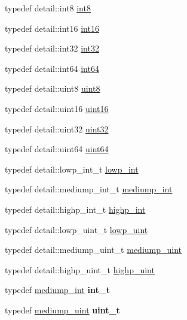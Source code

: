 \begin{DoxyCompactItemize}
\item 
typedef detail\+::int8 \hyperlink{group__gtc__type__precision_ga96254f9c1c4506fc8eb5cf3301ce8565}{int8}
\item 
typedef detail\+::int16 \hyperlink{group__gtc__type__precision_ga2945a61d12771f8954994fcddf02b021}{int16}
\item 
typedef detail\+::int32 \hyperlink{group__gtc__type__precision_ga632d8b25f6b61659f39ea4321fab92a4}{int32}
\item 
typedef detail\+::int64 \hyperlink{group__gtc__type__precision_ga435d75819cce297cc5fa21bd84ef89a5}{int64}
\item 
typedef detail\+::uint8 \hyperlink{group__gtc__type__precision_ga1a7dcd8aac97cc8020817c94049deff2}{uint8}
\item 
typedef detail\+::uint16 \hyperlink{group__gtc__type__precision_gad8c2939e1fdd8e5828b31d95c52255d5}{uint16}
\item 
typedef detail\+::uint32 \hyperlink{group__gtc__type__precision_ga202b6a53c105fcb7e531f9b443518451}{uint32}
\item 
typedef detail\+::uint64 \hyperlink{group__gtc__type__precision_gae3632bf9b37da66233d78930dd06378a}{uint64}
\item 
typedef detail\+::lowp\+\_\+int\+\_\+t \hyperlink{group__core__precision_ga4681244bf4a184734f03aa9df4e3d288}{lowp\+\_\+int}
\item 
typedef detail\+::mediump\+\_\+int\+\_\+t \hyperlink{group__core__precision_ga2a3dcbcd7f4e17663d393a12061ac6ac}{mediump\+\_\+int}
\item 
typedef detail\+::highp\+\_\+int\+\_\+t \hyperlink{group__core__precision_gaafed5240eb0a43328cb75faf5fb0a8c2}{highp\+\_\+int}
\item 
typedef detail\+::lowp\+\_\+uint\+\_\+t \hyperlink{group__core__precision_ga8077c90f2c87e419ea6c273157dcc1fc}{lowp\+\_\+uint}
\item 
typedef detail\+::mediump\+\_\+uint\+\_\+t \hyperlink{group__core__precision_ga08ae38ad78ade3539fdd1d25052b8c51}{mediump\+\_\+uint}
\item 
typedef detail\+::highp\+\_\+uint\+\_\+t \hyperlink{group__core__precision_gabfd1cf11193324a5f77d3831b6ac3205}{highp\+\_\+uint}
\item 
typedef \hyperlink{group__core__precision_ga2a3dcbcd7f4e17663d393a12061ac6ac}{mediump\+\_\+int} {\bfseries int\+\_\+t}
\item 
typedef \hyperlink{group__core__precision_ga08ae38ad78ade3539fdd1d25052b8c51}{mediump\+\_\+uint} {\bfseries uint\+\_\+t}

\end{DoxyCompactItemize}
